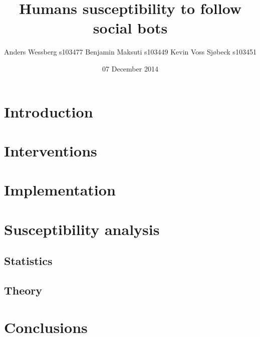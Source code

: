 \documentclass{acm_proc_article-sp}
\begin{document}
\title{Humans susceptibility to follow social bots}


\author{
\alignauthor
Anders Wessberg s103477
\alignauthor
Benjamin Maksuti s103449
\alignauthor
Kevin Voss Sj{\o}beck s103451
}
\date{07 December 2014}

\maketitle

\section{Introduction}

\section{Interventions}

\section{Implementation}

\section{Susceptibility analysis}

\subsection{Statistics}

\subsection{Theory}

\section{Conclusions}

\end{document}
